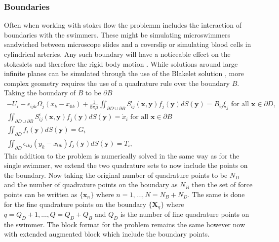 \subsubsection{Boundaries} \label{sec:boundries}
Often when working with stokes flow the problemm includes the interaction of boundaries with the swimmers. These might be simulating microswimmers sandwiched between microscope slides and a coverslip \cite{Gallagher2019RapidAnalysis} or simulating blood cells in cylindrical arteries. Any such boundary will have a noticeable effect on the stokeslets and therefore the rigid body motion \cite{Liron1981ExistenceBoundaries}. While solutions around large infinite planes can be simulated through the use of the Blakelet solution \cite{Ainley2008TheStokeslets,Cortez2015}, more complex geometry requires the use of a quadrature rule over the boundary $B$. Taking the boundary of $B$ to be $\partial B$
\begin{equation}
\label{eq:swimmingProblemBnd}
\begin{gathered}
    -U_{i}-\epsilon_{i j k} \Omega_{j}\left(x_{k}-x_{0 k}\right)+\frac{1}{8 \pi\mu} \iint_{\partial D \cup \partial B} S_{i j}^{\epsilon}(\bm{x}, \bm{y}) f_{j}(\bm{y}) d S({\bm{y}})=B_{i j} \dot{\xi}_{j} \text { for all } \bm{x} \in \partial D, \\
    \iint_{\partial D \cup \partial B} S_{i j}^{\epsilon}(\bm{x}, \bm{y}) f_{j}(\bm{y}) d S({\bm{y}}) = \dot{x}_i \text { for all } \bm{x} \in \partial B \\
    \iint_{\partial D} f_{i}(\bm{y}) d S({\bm{y}})=G_i \\
    \iint_{\partial D} \epsilon_{i k j} (y_{k}-x_{0 k}) f_{j}(\bm{y}) d S({\bm{y}})=T_i,
\end{gathered}
\end{equation}
This addition to the problem is numerically solved in the same way as for the single swimmer, we extend the two quadrature sets to now include the points on the boundary. Now taking the original number of quadrature points to be $N_D$ and the number of quadrature points on the boundary as $N_B$ then the set of force points can be written as  $\{\bm{x}_n\}$ where $n=1,\dots,N=N_B+N_D$. The same is done for the fine quadrature points on the boundary $\{\bm{X}_q\}$ where $q=Q_D+1,\dots,Q=Q_D+Q_B$ and $Q_D$ is the number of fine quadrature points on the swimmer. The block format for the problem remains the same however now with extended augmented block which include the boundary points. 

